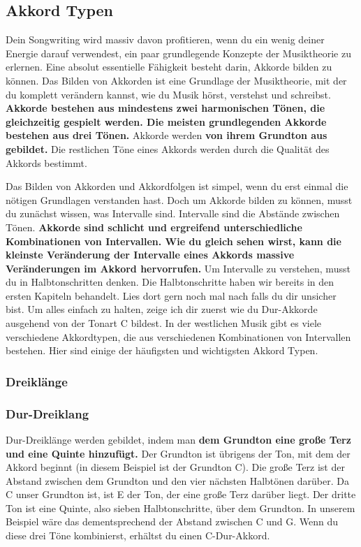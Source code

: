 \subsection{Akkord Typen}

Dein Songwriting wird massiv davon profitieren, wenn du ein wenig deiner Energie darauf verwendest, ein paar grundlegende Konzepte der Musiktheorie zu erlernen. Eine absolut essentielle Fähigkeit besteht darin, Akkorde bilden zu können. Das Bilden von Akkorden ist eine Grundlage der Musiktheorie, mit der du komplett verändern kannst, wie du Musik hörst, verstehst und schreibst. \textbf{Akkorde bestehen aus mindestens zwei harmonischen Tönen, die gleichzeitig gespielt werden. Die meisten grundlegenden Akkorde bestehen aus drei Tönen.} Akkorde werden \textbf{von ihrem Grundton aus gebildet.} Die restlichen Töne eines Akkords werden durch die Qualität des Akkords bestimmt.

Das Bilden von Akkorden und Akkordfolgen ist simpel, wenn du erst einmal die nötigen Grundlagen verstanden hast. Doch um Akkorde bilden zu können, musst du zunächst wissen, was Intervalle sind. Intervalle sind die Abstände zwischen Tönen. \textbf{Akkorde sind schlicht und ergreifend unterschiedliche Kombinationen von Intervallen. Wie du gleich sehen wirst, kann die kleinste Veränderung der Intervalle eines Akkords massive Veränderungen im Akkord hervorrufen.} Um Intervalle zu verstehen, musst du in Halbtonschritten denken. Die Halbtonschritte haben wir bereits in den ersten Kapiteln behandelt. Lies dort gern noch mal nach falls du dir unsicher bist. Um alles einfach zu halten, zeige ich dir zuerst wie du Dur-Akkorde ausgehend von der Tonart C bildest. In der westlichen Musik gibt es viele verschiedene Akkordtypen, die aus verschiedenen Kombinationen von Intervallen bestehen. Hier sind einige der häufigsten und wichtigsten Akkord Typen.


\subsubsection{Dreiklänge}
\subsubsection*{Dur-Dreiklang}
Dur-Dreiklänge werden gebildet, indem man \textbf{dem Grundton eine große Terz und eine Quinte hinzufügt.} Der Grundton ist übrigens der Ton, mit dem der Akkord beginnt (in diesem Beispiel ist der Grundton C). Die große Terz ist der Abstand zwischen dem Grundton und den vier nächsten Halbtönen darüber. Da C unser Grundton ist, ist E der Ton, der eine große Terz darüber liegt. Der dritte Ton ist eine Quinte, also sieben Halbtonschritte, über dem Grundton. In unserem Beispiel wäre das dementsprechend der Abstand zwischen C und G. Wenn du diese drei Töne kombinierst, erhältst du einen C-Dur-Akkord.

